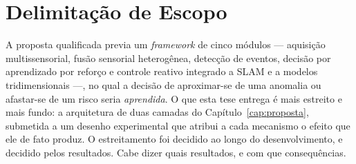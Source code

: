 \section{Delimitação de Escopo}
\label{sec:intro-escopo}

A proposta qualificada previa um \textit{framework} de cinco módulos --- aquisição
multissensorial, fusão sensorial heterogênea, detecção de eventos, decisão por
aprendizado por reforço e controle reativo integrado a \ac{SLAM} e a modelos
tridimensionais ---, no qual a decisão de aproximar-se de uma anomalia ou afastar-se
de um risco seria \emph{aprendida}. O que esta tese entrega é mais estreito e mais
fundo: a arquitetura de duas camadas do Capítulo~\ref{cap:proposta}, submetida a um
desenho experimental que atribui a cada mecanismo o efeito que ele de fato produz. O
estreitamento foi decidido ao longo do desenvolvimento, e decidido pelos resultados.
Cabe dizer quais resultados, e com que consequências.

